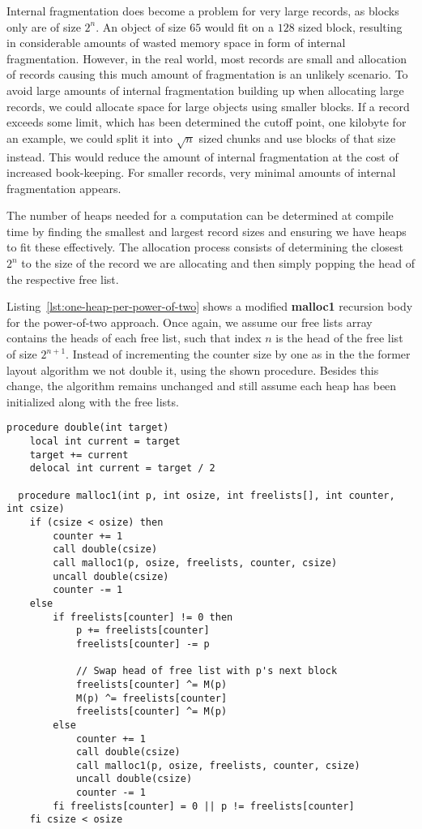 Internal fragmentation does become a problem for very large records, as blocks only are of size $2^n$. An object of size $65$ would fit on a $128$ sized block, resulting in considerable amounts of wasted memory space in form of internal fragmentation. However, in the real world, most records are small and allocation of records causing this much amount of fragmentation is an unlikely scenario. To avoid large amounts of internal fragmentation building up when allocating large records, we could allocate space for large objects using smaller blocks. If a record exceeds some limit, which has been determined the cutoff point, one kilobyte for an example, we could split it into $\sqrt{n}$ sized chunks and use blocks of that size instead. This would reduce the amount of internal fragmentation at the cost of increased book-keeping.
For smaller records, very minimal amounts of internal fragmentation appears. 

The number of heaps needed for a computation can be determined at compile time by finding the smallest and largest record sizes and ensuring we have heaps to fit these effectively. The allocation process consists of determining the closest $2^n$ to the size of the record we are allocating and then simply popping the head of the respective free list.

Listing~\ref{lst:one-heap-per-power-of-two} shows a modified \textbf{malloc1} recursion body for the power-of-two approach. Once again, we assume our free lists array contains the heads of each free list, such that index $n$ is the head of the free list of size $2^{n+1}$. Instead of incrementing the counter size by one as in the the former layout algorithm we not double it, using the shown procedure. Besides this change, the algorithm remains unchanged and still assume each heap has been initialized along with the free lists.\\

\begin{lstlisting}[caption={Allocation algorithm for one heap per power of two implemented in extended Janus.}, language=janus, style=basic, label={lst:one-heap-per-power-of-two}]
  procedure double(int target)
    local int current = target
    target += current
    delocal int current = target / 2

  procedure malloc1(int p, int osize, int freelists[], int counter, int csize)
    if (csize < osize) then
        counter += 1
        call double(csize)
        call malloc1(p, osize, freelists, counter, csize) 
        uncall double(csize)
        counter -= 1
    else
        if freelists[counter] != 0 then
            p += freelists[counter]
            freelists[counter] -= p

            // Swap head of free list with p's next block
            freelists[counter] ^= M(p)
            M(p) ^= freelists[counter]
            freelists[counter] ^= M(p)
        else
            counter += 1
            call double(csize)
            call malloc1(p, osize, freelists, counter, csize)
            uncall double(csize)
            counter -= 1
        fi freelists[counter] = 0 || p != freelists[counter]
    fi csize < osize   
\end{lstlisting}


